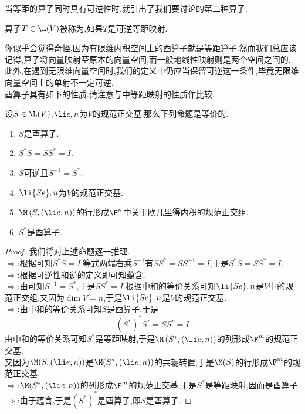 \documentclass{ctexart}
\begin{document}
当等距的算子同时具有可逆性时,就引出了我们要讨论的第二种算子.\\
\begin{definition}[2.1 定义:酉算子]
    算子$T\in\L(V)$被称为,如果$T$是可逆等距映射.
\end{definition}\noindent
你似乎会觉得奇怪,因为有限维内积空间上的酉算子就是等距算子.然而我们总应该记得,算子将向量映射至原本的向量空间,而一般地线性映射则是两个空间之间的.%
此外,在遇到无限维向量空间时,我们的定义中仍应当保留可逆这一条件,毕竟无限维向量空间上的单射不一定可逆.\\
酉算子具有如下的性质.请注意与中等距映射的性质作比较.
\begin{formal}[2.2 酉算子的性质]
    设$S\in\L(V)$,$\li e,n$为$V$的规范正交基,那么下列命题是等价的.
    \begin{enumerate}[label=\tbf{(\alph*)}]
        \item $S$是酉算子.
        \item $S^*S=SS^*=I$.
        \item $S$可逆且$S^{-1}=S^*$.
        \item $\li{Se},n$为$V$的规范正交基.
        \item $\M\left(S,\left(\li e,n\right)\right)$的行形成$\F^n$中关于欧几里得内积的规范正交组.
        \item $S^*$是酉算子.
    \end{enumerate}
\end{formal}
\begin{proof}
    我们将对上述命题逐一推理.\\
    $\Rightarrow$:根据可知$S^*S=I$.等式两端右乘$S^{-1}$有$SS^*=SS^{-1}=I$,于是$S^*S=SS^*=I$.\\
    $\Rightarrow$:根据可逆性和逆的定义即可知蕴含.\\
    $\Rightarrow$:由可知$S^{-1}=S^*$,于是$SS^*=I$.根据中和的等价关系可知$\li{Se},n$是$V$中的规范正交组.又因为$\dim V=n$,于是$\li{Se},n$是$V$的规范正交基.\\
    $\Rightarrow$:由中和的等价关系可知$S$是酉算子.于是
    \[\left(S^*\right)^*S^*=SS^*=I\]
    由中和的等价关系可知$S^*$是等距映射,于是$\M\left(S^*,\left(\li e,n\right)\right)$的列形成$\F^m$的规范正交基.\\
    又因为$\M(S,(\li e,n))$是$\M(S^*,(\li e,n))$的共轭转置,于是$\M(S)$的行形成$\F^m$的规范正交基.\\
    $\Rightarrow$:$\M(S^*,(\li e,n))$的列形成$\F^m$的规范正交基,于是$S^*$是等距映射,因而是酉算子.\\
    $\Rightarrow$:由于蕴含,于是$\left(S^*\right)^*$是酉算子,即$S$是酉算子.
\end{proof}\noindent
\end{document}
